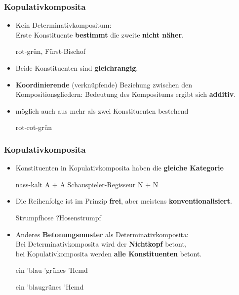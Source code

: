 \begin{frame}
\frametitle{Kopulativkomposita}

\begin{itemize}
	\item Kein Determinativkompositum: \\
	Erste Konstituente \textbf{bestimmt} die zweite \textbf{nicht näher}.
	
	\ea rot-grün, Fürst-Bischof
	\z 
	
	\item Beide Konstituenten sind \textbf{gleichrangig}.
	
	\item \textbf{Koordinierende} (\dash verknüpfende) Beziehung zwischen den Kompositionsgliedern: Bedeutung des Kompositums ergibt sich \textbf{additiv}.
	
	\settowidth{} 
	\ea 
		 
		 
		\z 
	\z 

	\item möglich auch aus mehr als zwei Konstituenten bestehend
		
	\ea rot-rot-grün
	\z 
	
\end{itemize}

\end{frame}


\begin{frame}
\frametitle{Kopulativkomposita}

\begin{itemize}
	\item Konstituenten in Kopulativkomposita haben die \textbf{gleiche Kategorie}
	
	\ea 
		\ea nass-kalt \ras A $+$ A
		\ex Schauspieler-Regisseur \ras N $+$ N
		\z 
	\z 
	
	\item Die Reihenfolge ist im Prinzip \textbf{frei}, aber meistens \textbf{konventionalisiert}.
	
	\ea Strumpfhose \vs ?Hosenstrumpf
	\z 
	
	\item Anderes \textbf{Betonungsmuster} als Determinativkomposita: \\
	Bei Determinativkomposita wird der \textbf{Nichtkopf} betont, \\
	bei Kopulativkomposita werden \textbf{alle Konstituenten} betont.
	
	\settowidth{} 
	\ea 
		\ea ein 'blau-'grünes 'Hemd  \jambox{[Kopulativkompositum]}
	
		\ex ein 'blaugrünes 'Hemd \jambox{[Determinativkompositum]}
		\z 
	\z
		 

\end{itemize}


\end{frame}


